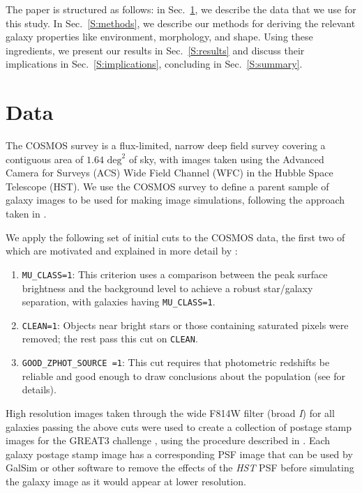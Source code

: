 \documentclass[twocolumn,useAMS,usenatbib]{mn2e}
\begin{document}
The paper is structured as follows: in Sec.~\ref{S:data}, we describe
the data that we use for this study.  In Sec.~\ref{S:methods}, we
describe our methods for deriving the relevant galaxy properties
like environment, morphology, and shape.  
Using these ingredients, we present our results in Sec.~\ref{S:results}
and discuss their implications in Sec.~\ref{S:implications},
concluding in Sec.~\ref{S:summary}.
\section{Data}
\label{S:data}
The COSMOS survey \citep{COSMOS_overview, COSMOS_generic, COSMOS_Alexie} is a flux-limited, narrow deep field survey covering a contiguous area of $1.64 \text{ deg}^2$ of sky, with images taken using the Advanced Camera for Surveys (ACS) Wide Field Channel (WFC)
in the Hubble Space Telescope (HST).  We use the COSMOS survey to
define a parent sample of galaxy images to be used for making image
simulations, following the approach taken in
\cite{2012MNRAS.420.1518M,great3}.

We apply the following set of initial cuts to the COSMOS data, the
first two of which
are motivated and explained in more detail by \cite{COSMOS_Alexie}:
\begin{enumerate}
 \item \texttt{MU\_CLASS=1}: This criterion uses a comparison between
   the peak surface brightness and the background level to achieve a
   robust star/galaxy separation, with galaxies having \texttt{MU\_CLASS=1}. 
 \item \texttt{CLEAN=1}: Objects near bright stars or those containing
   saturated pixels were removed; the rest pass this cut on \texttt{CLEAN}. 
 \item \texttt{GOOD\_ZPHOT\_SOURCE =1}: This cut requires that
   photometric redshifts be reliable and good enough to draw
   conclusions about the population (see \citealt{2012MNRAS.420.1518M}
   for details).
\end{enumerate}

High resolution images taken through the wide F814W filter (broad
\emph{I}) for all galaxies passing the above cuts were used to create
a collection of postage stamp images for the GREAT3 challenge
\citep{great3}, using the procedure described in
\cite{2012MNRAS.420.1518M}.  Each galaxy postage stamp image has a
corresponding PSF image that can be used by {\sc GalSim} or other
software to remove the effects of the {\em HST} PSF before simulating
the galaxy image as it would appear at lower resolution.
\end{document}
